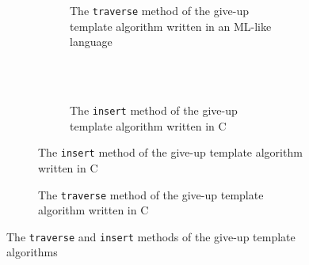 \documentclass[a4paper,UKenglish,cleveref, autoref, thm-restate]{lipics-v2021}
\begin{document}
%		 
%		 

\begin{figure}[h]
	\begin{subfigure}[t]{0.48\textwidth}
		\begin{subfigure}[t]{\textwidth}
			 
			\caption{The \lstinline{traverse} method of the give-up template algorithm written in an ML-like language}
			\label{traverse_giveup_a}	
		\end{subfigure}
		\\ \\ 
		\begin{subfigure}[t]{\textwidth}
			 
			\caption{The \lstinline{insert} method of the give-up template algorithm written in C}
			\label{insert_giveup}	
		\end{subfigure}
	\end{subfigure}\qquad
	\begin{subfigure}[t]{0.48\textwidth}
		 
		\caption{The \lstinline{traverse} method of the give-up template algorithm written in C}
		\label{traverse_giveup_b}
	\end{subfigure}
	\caption{The \lstinline{traverse} and \lstinline{insert} methods of the give-up template algorithms}
	\label{traverse_giveup}
\end{figure}
\end{document}

